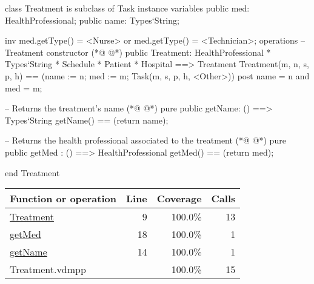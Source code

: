 \begin{vdmpp}[breaklines=true]
class Treatment is subclass of Task
instance variables
  public med: HealthProfessional;
  public name: Types`String;
  
  inv med.getType() = <Nurse> or med.getType() = <Technician>;
operations
 -- Treatment constructor
(*@
\label{Treatment:9}
@*)
 public Treatment: HealthProfessional * Types`String * Schedule * Patient * Hospital ==> Treatment
  Treatment(m, n, s, p, h) == (name := n; med := m; Task(m, s, p, h, <Other>))
 post name = n and med = m;
 
 -- Returns the treatment's name
(*@
\label{getName:14}
@*)
 pure public getName: () ==> Types`String
  getName() == (return name);
 
 -- Returns the health professional associated to the treatment
(*@
\label{getMed:18}
@*)
 pure public getMed : () ==> HealthProfessional
  getMed() == (return med);

end Treatment
\end{vdmpp}
\bigskip
\begin{longtable}{|l|r|r|r|}
\hline
Function or operation & Line & Coverage & Calls \\
\hline
\hline
\hyperref[Treatment:9]{Treatment} & 9&100.0\% & 13 \\
\hline
\hyperref[getMed:18]{getMed} & 18&100.0\% & 1 \\
\hline
\hyperref[getName:14]{getName} & 14&100.0\% & 1 \\
\hline
\hline
Treatment.vdmpp & & 100.0\% & 15 \\
\hline
\end{longtable}

